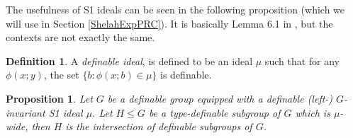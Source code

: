 \documentclass[12pt]{article}
\newtheorem{prop}[thm]{Proposition}
\theoremstyle{definition}
\newtheorem{defi}[thm]{Definition}
\theoremstyle{mystyle}
\theoremstyle{remark}
\begin{document}
The usefulness of S1 ideals can be seen in the following
proposition (which we will use in Section \ref{ShelahExpPRC}). It
is basically Lemma 6.1 in \cite{HrPi}, but the contexts are
not exactly the same.

\begin{defi}
A \emph{definable ideal}, is defined to be an ideal $\mu$ such
that for any $\phi(x;y)$, the set $\{b : \phi(x;b)\in \mu\}$ is
definable.
\end{defi}


\begin{prop}\label{TdefGps}
Let $G$ be a definable group equipped with a definable (left-)
$G$-invariant S1 ideal $\mu$. Let $H\leq G$ be a type-definable
subgroup of $G$ which is $\mu$-wide, then $H$ is the intersection
of definable subgroups of $G$.
\end{prop}
\end{document}
